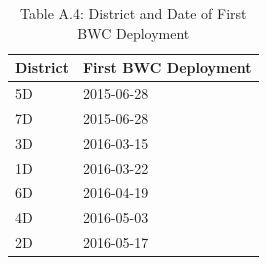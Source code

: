 \begin{table}

\caption{Table A.4: District and Date of First BWC Deployment}
\centering
\begin{tabular}[t]{ll}
\toprule
District & First BWC Deployment\\
\midrule
5D & 2015-06-28\\
7D & 2015-06-28\\
3D & 2016-03-15\\
1D & 2016-03-22\\
6D & 2016-04-19\\
\addlinespace
4D & 2016-05-03\\
2D & 2016-05-17\\
\bottomrule
\end{tabular}
\end{table}
